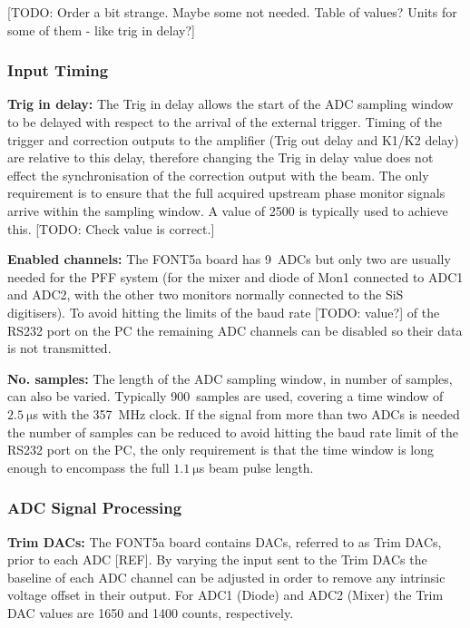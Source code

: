 [TODO: Order a bit strange. Maybe some not needed. Table of values? Units for some of them - like trig in delay?]

\subsubsection{Input Timing}

\textbf{Trig in delay:} The Trig in delay allows the start of the ADC sampling window to be delayed with respect to the arrival of the external trigger. Timing of the trigger and correction outputs to the amplifier (Trig out delay and K1/K2 delay) are relative to this delay, therefore changing the Trig in delay value does not effect the synchronisation of the correction output with the beam. The only requirement is to ensure that the full acquired upstream phase monitor signals arrive within the sampling window. A value of 2500 is typically used to achieve this. [TODO: Check value is correct.]

\textbf{Enabled channels:} The FONT5a board has 9~ADCs but only two are usually needed for the PFF system (for the mixer and diode of Mon1 connected to ADC1 and ADC2, with the other two monitors normally connected to the SiS digitisers). To avoid hitting the limits of the baud rate  [TODO: value?] of the RS232 port on the PC the remaining ADC channels can be disabled so their data is not transmitted.

\textbf{No. samples:} The length of the ADC sampling window, in number of samples, can also be varied. Typically 900~samples are used, covering a time window of \(2.5~\mathrm{\mu}\)s with the 357~MHz clock. If the signal from more than two ADCs is needed the number of samples can be reduced to avoid hitting the baud rate limit of the RS232 port on the PC, the only requirement is that the time window is long enough to encompass the full \(1.1~\mathrm{\mu}\)s beam pulse length.

\subsubsection{ADC Signal Processing}

\textbf{Trim DACs:} The FONT5a board contains DACs, referred to as Trim DACs, prior to each ADC [REF]. By varying the input sent to the Trim DACs the baseline of each ADC channel can be adjusted in order to remove any intrinsic voltage offset in their output. For ADC1 (Diode) and ADC2 (Mixer) the Trim DAC values are 1650 and 1400 counts, respectively.

